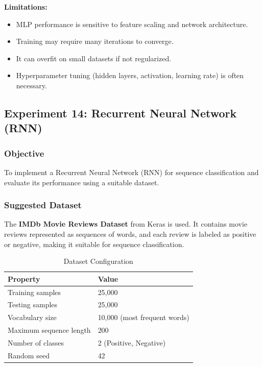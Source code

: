 \documentclass[a4paper,11pt]{article}
\begin{document}
\begin{itemize}
\textbf{Limitations:}
\begin{itemize}
    \item MLP performance is sensitive to feature scaling and network architecture.
    \item Training may require many iterations to converge.
    \item It can overfit on small datasets if not regularized.
    \item Hyperparameter tuning (hidden layers, activation, learning rate) is often necessary.
\end{itemize}


\subsection{Experiment 14: Recurrent Neural Network (RNN)}

\subsubsection{Objective}
To implement a Recurrent Neural Network (RNN) for sequence classification and evaluate its performance using a suitable dataset.

\subsubsection{Suggested Dataset}
The \textbf{IMDb Movie Reviews Dataset} from Keras is used. It contains movie reviews represented as sequences of words, and each review is labeled as positive or negative, making it suitable for sequence classification.

\begin{table}[H]
\centering
\caption{Dataset Configuration}
\begin{tabular}{ll}
\toprule
\textbf{Property} & \textbf{Value} \\
\midrule
Training samples      & 25,000 \\
Testing samples       & 25,000 \\
Vocabulary size       & 10,000 (most frequent words) \\
Maximum sequence length & 200 \\
Number of classes     & 2 (Positive, Negative) \\
Random seed           & 42 \\
\bottomrule
\end{tabular}
\end{table}


\end{itemize}
\end{document}
